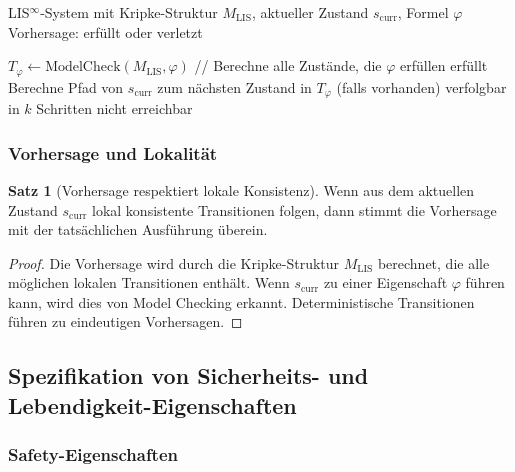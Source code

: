 \documentclass[a4paper,12pt]{article}
\theoremstyle{definition}
\newtheorem{satz}{Satz}
\begin{document}
	\begin{algorithm}[H]
		\caption{Vorhersage-Algorithmus für LIS$^{\infty}$}
		\label{alg:vorhersage}
		\begin{algorithmic}[1]
			\Require LIS$^{\infty}$-System mit Kripke-Struktur $M_{\text{LIS}}$, aktueller Zustand $s_{\text{curr}}$, Formel $\varphi$
			\Ensure Vorhersage: erfüllt oder verletzt
			
			\State $T_{\varphi} \leftarrow \text{ModelCheck}(M_{\text{LIS}}, \varphi)$ \quad // Berechne alle Zustände, die $\varphi$ erfüllen
			\State \Return erfüllt
			\Else
			\State Berechne Pfad von $s_{\text{curr}}$ zum nächsten Zustand in $T_{\varphi}$ (falls vorhanden)
			\State \Return verfolgbar in $k$ Schritten
			\Else
			\State \Return nicht erreichbar
			\EndIf
			\EndIf
		\end{algorithmic}
	\end{algorithm}
	
	\subsubsection{Vorhersage und Lokalität}
	
	\begin{satz}[Vorhersage respektiert lokale Konsistenz]
		\label{satz:vorhersage_lokalitaet}
		Wenn aus dem aktuellen Zustand $s_{\text{curr}}$ lokal konsistente Transitionen folgen, dann stimmt die Vorhersage mit der tatsächlichen Ausführung überein.
	\end{satz}
	
	\begin{proof}
		Die Vorhersage wird durch die Kripke-Struktur $M_{\text{LIS}}$ berechnet, die alle möglichen lokalen Transitionen enthält. Wenn $s_{\text{curr}}$ zu einer Eigenschaft $\varphi$ führen kann, wird dies von Model Checking erkannt. Deterministische Transitionen führen zu eindeutigen Vorhersagen.
	\end{proof}
	
	\subsection{Spezifikation von Sicherheits- und Lebendigkeit-Eigenschaften}
	
	\subsubsection{Safety-Eigenschaften}
	
\end{document}
